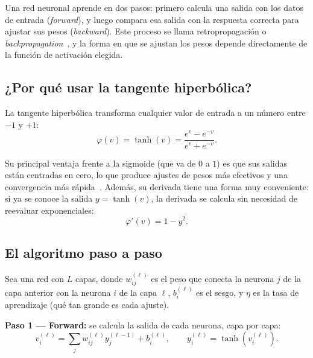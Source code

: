 
Una red neuronal aprende en dos pasos: primero calcula una salida con los datos de entrada (\emph{forward}), y luego compara esa salida con la respuesta correcta para ajustar sus pesos (\emph{backward}). Este proceso se llama retropropagación o \emph{backpropagation}~\cite{rumelhart1986learning}, y la forma en que se ajustan los pesos depende directamente de la función de activación elegida.

\subsection{¿Por qué usar la tangente hiperbólica?}

La tangente hiperbólica transforma cualquier valor de entrada a un número entre $-1$ y $+1$:
\begin{equation}
    \varphi(v) = \tanh(v) = \frac{e^{v} - e^{-v}}{e^{v} + e^{-v}}.
    \label{eq:tanh}
\end{equation}

Su principal ventaja frente a la sigmoide (que va de $0$ a $1$) es que sus salidas están centradas en cero, lo que produce ajustes de pesos más efectivos y una convergencia más rápida~\cite{lecun2012efficient}. Además, su derivada tiene una forma muy conveniente: si ya se conoce la salida $y = \tanh(v)$, la derivada se calcula sin necesidad de reevaluar exponenciales:
\begin{equation}
    \varphi'(v) = 1 - y^{2}.
    \label{eq:tanh-deriv}
\end{equation}

\subsection{El algoritmo paso a paso}

Sea una red con $L$ capas, donde $w_{ij}^{(\ell)}$ es el peso que conecta la neurona $j$ de la capa anterior con la neurona $i$ de la capa $\ell$, $b_{i}^{(\ell)}$ es el sesgo, y $\eta$ es la tasa de aprendizaje (qué tan grande es cada ajuste).

\textbf{Paso 1 --- Forward:} se calcula la salida de cada neurona, capa por capa:
\begin{equation}
    v_{i}^{(\ell)} = \sum_{j} w_{ij}^{(\ell)} y_{j}^{(\ell-1)} + b_{i}^{(\ell)}, \qquad y_{i}^{(\ell)} = \tanh(v_{i}^{(\ell)}).
\end{equation}


